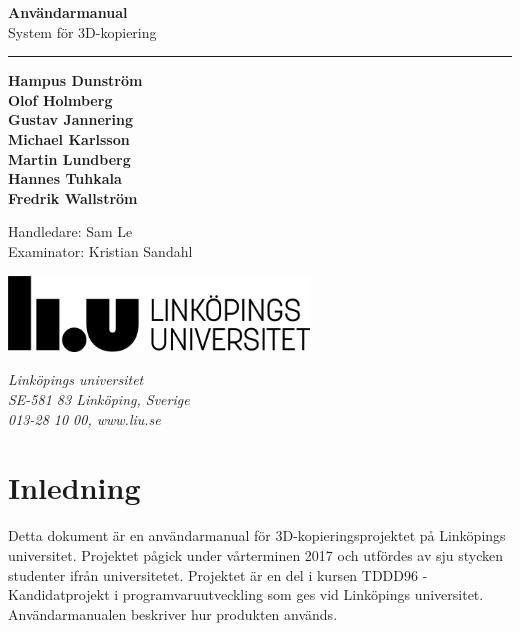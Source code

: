 \documentclass[a4paper,titlepage,12pt]{article}
\begin{document}
\begin{titlepage}

\vspace*{\fill}
\huge
\textbf{Användarmanual} \\
\Large
System för 3D-kopiering \\
\noindent\rule{17cm}{0.4pt}
\bigskip

\small
\textbf{Hampus Dunström \\
Olof Holmberg \\
Gustav Jannering \\
Michael Karlsson \\
Martin Lundberg \\
Hannes Tuhkala \\
Fredrik Wallström}
\bigskip
\bigskip

Handledare: Sam Le \\
Examinator: Kristian Sandahl

\date{\today}
\vspace*{\fill}

\vspace*{\fill}
\begin{minipage}[b]{0.7\textwidth}
	\includegraphics[width=8cm]{images/liu-logga.png}
\end{minipage}
\begin{minipage}[b]{0.4\textwidth}
	\normalsize
	\textit{Linköpings universitet} \\
	\textit{SE-581 83 Linköping, Sverige}\\
	\textit{013-28 10 00, www.liu.se}
\end{minipage}

\end{titlepage}
\newpage
\begin{center}

\tableofcontents
\newpage

\end{center}

\section{Inledning}
	Detta dokument är en användarmanual för 3D-kopieringsprojektet på Linköpings universitet. Projektet pågick under vårterminen 2017 och utfördes av sju stycken studenter ifrån universitetet. Projektet är en del i kursen TDDD96 - Kandidatprojekt i programvaruutveckling som ges vid Linköpings universitet. Användarmanualen beskriver hur produkten används.
	
\end{document}
